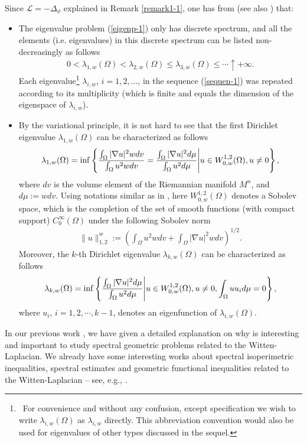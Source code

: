 \documentclass[12pt]{article}
\begin{document}
Since $\mathcal{L}=-\Delta_{\phi}$ explained in Remark
\ref{remark1-1}, one has from \cite[Section 1]{JM-1} (see also
\cite[pp. 1247-1248]{CM}) that:

\begin{itemize}
\item The eigenvalue problem (\ref{eigenp-1}) only has discrete
spectrum, and all the elements (i.e. eigenvalues) in this discrete
spectrum can be listed non-decreasingly as follows
 \begin{eqnarray} \label{sequen-1}
 0<\lambda_{1,w}(\Omega)<\lambda_{2,w}(\Omega)\leq\lambda_{3,w}(\Omega)\leq\cdots\uparrow+\infty.
 \end{eqnarray}
Each eigenvalue\footnote{~For convenience and without any confusion,
except specification we wish to write $\lambda_{i,w}(\Omega)$ as
$\lambda_{i,w}$ directly. This abbreviation convention would also be
used for eigenvalues of other types discussed in the sequel.}
$\lambda_{i,w}$, $i=1,2,\ldots$, in the sequence (\ref{sequen-1})
was repeated according to its multiplicity (which is finite and
equals the dimension of the eigenspace of $\lambda_{i,w}$).

 \item By the variational principle, it is not hard to see that the
 first Dirichlet eigenvalue $\lambda_{1,w}(\Omega)$ can be
 characterized as follows
  \begin{eqnarray} \label{chr-1}
 \lambda_{1,w}(\Omega)=\inf\left\{\frac{\int_{\Omega}|\nabla u|^{2}wdv}{\int_{\Omega}u^{2}wdv}=
 \frac{\int_{\Omega}|\nabla u|^{2}d\mu}{\int_{\Omega}u^{2}d\mu}\Bigg{|}u\in
 W^{1,2}_{0,w}(\Omega),u\neq0\right\},
  \end{eqnarray}
  where $dv$ is the volume element of the Riemannian manifold $M^n$,
  and $d\mu:=wdv$. Using notations similar as in \cite{CM}, here $W^{1,2}_{0,w}(\Omega)$
denotes a Sobolev space, which is the completion of the set of
smooth functions (with compact support) $C^{\infty}_{0}(\Omega)$
under the following Sobolev norm
\begin{eqnarray*}
\|u\|^{w}_{1,2}:=\left(\int_{\Omega}u^{2}wdv+\int_{\Omega}|\nabla
u|^{2}wdv\right)^{1/2}.
\end{eqnarray*}
Moreover, the $k$-th Dirichlet eigenvalue $\lambda_{k,w}(\Omega)$
can be characterized as follows
 \begin{eqnarray*}
 \lambda_{k,w}(\Omega)=\inf\left\{\frac{\int_{\Omega}|\nabla u|^{2}d\mu}{\int_{\Omega}u^{2}d\mu}
 \Bigg{|}u\in W^{1,2}_{0,w}(\Omega),u\neq0,\int_{\Omega}uu_{i}d\mu=0\right\},
 \end{eqnarray*}
where $u_{i}$, $i=1,2,\cdots,k-1$, denotes an eigenfunction of
$\lambda_{i,w}(\Omega)$.
\end{itemize}
In our previous work \cite[Introduction]{CM1}, we have given a
detailed explanation on why is interesting and important to study
spectral geometric problems related to the Witten-Laplacian. We
already have some interesting works about spectral isoperimetric
inequalities, spectral estimates and geometric functional
inequalities related to the Witten-Laplacian -- see, e.g., \cite{CM,
CM1, DMWW, JM1, JM2, YWMD}.
\end{document}
